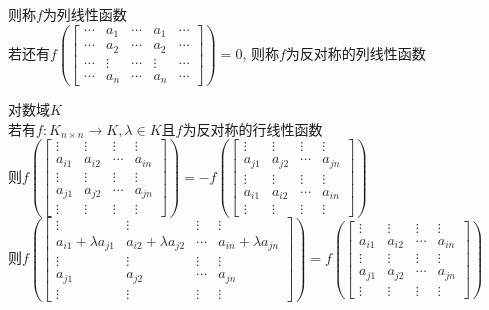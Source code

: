 \begin{dingyi}
\mbox{则称$f$为列线性函数}\\
若还有$f(\begin{bmatrix}\cdots & a_{1} & \cdots & a_{1} & \cdots \\ \cdots & a_{2} & \cdots & a_{2} & \cdots \\ \cdots & \vdots & \cdots & \vdots & \cdots \\ \cdots & a_{n} & \cdots & a_{n} & \cdots \end{bmatrix})=0$,
则称$f$为反对称的列线性函数
\end{dingyi}

\begin{dingli}
对数域$K$\\
若有$f:K_{n\times n}\to K, \lambda\in K$且$f$为反对称的行线性函数\\
则$f(\begin{bmatrix}\vdots & \vdots & \vdots & \vdots \\ a_{i1} & a_{i2} & \cdots & a_{in}  \\ \vdots & \vdots & \vdots & \vdots \\ a_{j1} & a_{j2} & \cdots & a_{jn}  \\ \vdots & \vdots & \vdots & \vdots \end{bmatrix})=-f(\begin{bmatrix}\vdots & \vdots & \vdots & \vdots \\ a_{j1} & a_{j2} & \cdots & a_{jn}  \\ \vdots & \vdots & \vdots & \vdots \\ a_{i1} & a_{i2} & \cdots & a_{in}  \\ \vdots & \vdots & \vdots & \vdots \end{bmatrix})$\\
则$f(\begin{bmatrix}\vdots & \vdots & \vdots & \vdots \\ a_{i1}+\lambda a_{j1} & a_{i2}+\lambda a_{j2} & \cdots & a_{in}+\lambda a_{jn}  \\ \vdots & \vdots & \vdots & \vdots \\ a_{j1} & a_{j2} & \cdots & a_{jn}  \\ \vdots & \vdots & \vdots & \vdots \end{bmatrix})=f(\begin{bmatrix}\vdots & \vdots & \vdots & \vdots \\ a_{i1} & a_{i2} & \cdots & a_{in}  \\ \vdots & \vdots & \vdots & \vdots \\ a_{j1} & a_{j2} & \cdots & a_{jn}  \\ \vdots & \vdots & \vdots & \vdots \end{bmatrix})$\\

\end{dingli}
